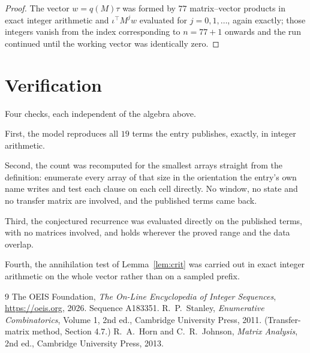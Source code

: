 \documentclass[11pt,a4paper]{article}
\theoremstyle{plain}
\theoremstyle{definition}
\begin{document}
\begin{proof}
The vector $w=q(M)\tau$ was formed by $77$ matrix--vector products in exact integer
arithmetic and $\iota^{\!\top}M^{j}w$ evaluated for $j=0,1,\dots$, again exactly; those
integers vanish from the index corresponding to $n=77+1$ onwards and the run continued
until the working vector was identically zero.
\end{proof}

\section{Verification}

Four checks, each independent of the algebra above.

First, the model reproduces all $19$ terms the entry publishes, exactly, in integer
arithmetic.

Second, the count was recomputed for the smallest arrays straight from the definition:
enumerate every array of that size in the orientation the entry's own name writes and test each
clause on each cell directly. No window, no state and no transfer matrix are involved, and the
published terms came back.

Third, the conjectured recurrence was evaluated directly on the published terms, with no
matrices involved, and holds wherever the proved range and the data overlap.

Fourth, the annihilation test of Lemma~\ref{lem:crit} was carried out in exact integer
arithmetic on the whole vector rather than on a sampled prefix.

\begin{thebibliography}{9}
 The OEIS Foundation, \emph{The On-Line Encyclopedia of Integer
Sequences}, \url{https://oeis.org}, 2026. Sequence A183351.
 R.~P.~Stanley, \emph{Enumerative Combinatorics}, Volume 1, 2nd ed.,
Cambridge University Press, 2011. (Transfer-matrix method, Section 4.7.)
 R.~A.~Horn and C.~R.~Johnson, \emph{Matrix Analysis}, 2nd ed., Cambridge
University Press, 2013.
\end{thebibliography}
\end{document}
